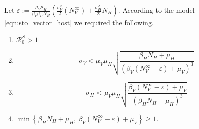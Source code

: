\begin{assumption} \label{ass:persistence}
    Let
    $
        \displaystyle
        \varepsilon:=
            \frac{\mu_V \mu_H}{\beta_V \beta_H N_H}
                \left(
                    \frac{\sigma_V ^ 2}{2}
                    \left(
                        N_V ^ {\infty}
                    \right)
                    +
                    \frac{\sigma_H ^ 2}{2}
                    N_H
                \right)
    $.
    According to the model \eqref{eqn:sto_vector_host} we required the
    following.
    \begin{enumerate}[\bf{(P-}1)]
        \item
            $ \mathcal{R}_0 ^ S > 1$
             
        \item
            \begin{equation*}
                \sigma_V 
                    < \mu_V \mu_H
                    \sqrt{
                        \frac{\beta_H N_H + \mu_H}{
                            \left(
                                \beta_V
                                \left(
                                    N_V ^ {\infty} - \varepsilon
                                \right) 
                                + \mu_V
                            \right)  ^ 3
                        }
                    }
            \end{equation*}
        \item
            \begin{equation*}
                \sigma_H 
                    < \mu_V \mu_H
                    \sqrt{
                        \frac{\beta_V (N_V ^ {\infty} - \varepsilon) + \mu_V}{
                            \left(
                                \beta_H N_H + \mu_H
                            \right)  ^ 3
                        }
                    }
            \end{equation*}
        \item
        $
            \displaystyle
            \min
            \left\{
                 \beta_H N_H + \mu_H, \ 
                 \beta_V (N_V ^ {\infty} - \varepsilon) + \mu_V
            \right\}
            \geq 1.
        $
    \end{enumerate}
\end{assumption}